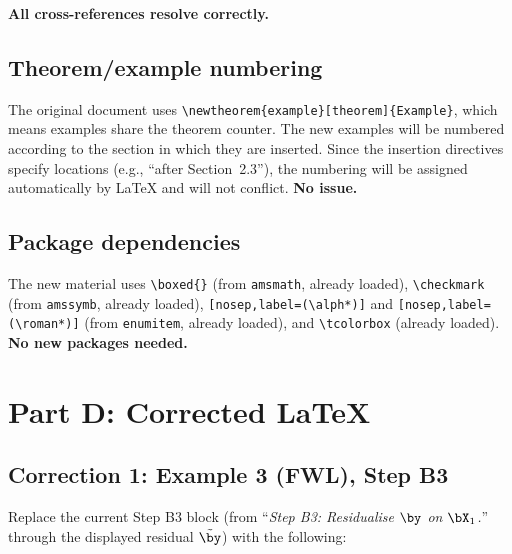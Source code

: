 \noindent\textbf{All cross-references resolve correctly.}


\subsection*{Theorem/example numbering}

The original document uses \verb|\newtheorem{example}[theorem]{Example}|,
which means examples share the theorem counter.  The new examples will be
numbered according to the section in which they are inserted.  Since the
insertion directives specify locations (e.g., ``after Section~2.3''),
the numbering will be assigned automatically by \LaTeX{} and will not
conflict.  \textbf{No issue.}


\subsection*{Package dependencies}

The new material uses \verb|\boxed{}| (from \texttt{amsmath}, already loaded),
\verb|\checkmark| (from \texttt{amssymb}, already loaded),
\verb|[nosep,label=(\alph*)]| and \verb|[nosep,label=(\roman*)]| (from
\texttt{enumitem}, already loaded), and \verb|\tcolorbox| (already loaded).
\textbf{No new packages needed.}



\section*{Part D: Corrected \LaTeX}



\subsection*{Correction 1: Example 3 (FWL), Step B3}

Replace the current Step B3 block (from ``\emph{Step B3: Residualise
$\by$ on $\bX_1$.}'' through the displayed residual $\tilde{\by}$)
with the following:

